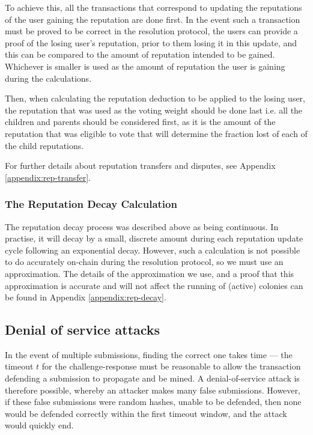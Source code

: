 To achieve this, all the transactions that correspond to updating the reputations of the user gaining the reputation are done first. In the event such a transaction must be proved to be correct in the resolution protocol, the users can provide a proof of the losing user's reputation, prior to them losing it in this update, and this can be compared to the amount of reputation intended to be gained. Whichever is smaller is used as the amount of reputation the user is gaining during the calculations.

Then, when calculating the reputation deduction to be applied to the losing user, the reputation that was used as the voting weight should be done last i.e. all the children and parents should be considered first, as it is the amount of the reputation that was eligible to vote that will determine the fraction lost of each of the child reputations. %

For further details about reputation transfers and disputes, see Appendix \ref{appendix:rep-transfer}.

\subsubsection{The Reputation Decay Calculation}\label{sec:repdecay}
The reputation decay process was described above as being continuous. In practise, it will decay by a small, discrete amount during each reputation update cycle following an exponential decay. However, such a calculation is not possible to do accurately on-chain during the resolution protocol, so we must use an approximation. The details of the approximation we use, and a proof that this approximation is accurate and will not affect the running of (active) colonies can be found in Appendix \ref{appendix:rep-decay}.

\subsection{Denial of service attacks}\label{sec:mining-possible-attacks}

In the event of multiple submissions, finding the correct one takes time --- the timeout $t$ for the challenge-response must be reasonable to allow the transaction defending a submission to propagate and be mined. A denial-of-service attack is therefore possible, whereby an attacker makes many false submissions. However, if these false submissions were random hashes, unable to be defended, then none would be defended correctly within the first timeout window, and the attack would quickly end. 


